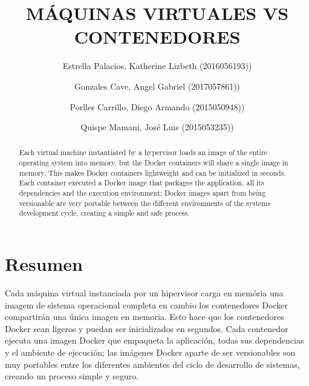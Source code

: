 \documentclass[preprint,12pt]{elsarticle}
\begin{document}
	
	\begin{frontmatter} 

		\title{\huge MÁQUINAS VIRTUALES VS CONTENEDORES}
		
		\author{Estrella Palacios, Katherine Lizbeth              	(2016056193))}
		\author{Gonzales Cave, Angel Gabriel              	        (2017057861))}
		\author{Porlles Carrillo, Diego Armando	         	(2015050948))} %
		\author{Quispe Mamani, José Luis             		(2015053235))} %
		\address{Escuela Profesional de Ingeniería de Sistemas}
		\address{Universidad Privada de Tacna}
		\address{Tacna, Perú}
		

		\begin{abstract}	
Each virtual machine instantiated by a hypervisor loads an image of the entire operating system into memory, but the Docker containers will share a single image in memory. This makes Docker containers lightweight and can be initialized in seconds. Each container executed a Docker image that packages the application, all its dependencies and the execution environment; Docker images apart from being versionable are very portable between the different environments of the systems development cycle, creating a simple and safe process.

		\end{abstract}


	\end{frontmatter}


\section{Resumen}
Cada máquina virtual instanciada por un hipervisor carga en memória una imagem de sistema operacional completa en cambio los contenedores Docker compartirán una única imagen en memoria. Esto hace que los contenedores Docker sean ligeros y puedan ser inicializados en segundos. Cada contenedor ejecuta una imagen Docker que empaqueta la aplicación, todas sus dependencias y el ambiente de ejecución; las imágenes Docker aparte de ser versionables son muy portables entre los diferentes ambientes del ciclo de desarrollo de sistemas, creando un proceso simple y seguro. 
\end{document}
